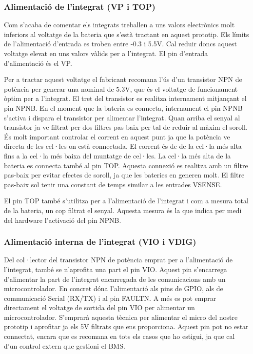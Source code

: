 \subsubsection{Alimentació de l'integrat (VP i TOP)}
Com s'acaba de comentar els integrats treballen a uns valors electrònics molt inferiors al voltatge de la bateria que s'està tractant en aquest prototip. Els límits de l'alimentació d'entrada es troben entre -0.3 i 5.5V. Cal reduir doncs aquest voltatge elevat en uns valors vàlids per a l'integrat. El pin d'entrada d'alimentació és el VP. 

Per a tractar aquest voltatge el fabricant recomana l'ús d'un transistor NPN de potència per generar una nominal de 5.3V, que és el voltatge de funcionament òptim per a l'integrat. El tret del transistor es realitza internament mitjançant el pin NPNB. En el moment que la bateria es connecta, internament el pin NPNB s'activa i dispara el transistor per alimentar l'integrat. Quan arriba el senyal al transistor ja ve filtrat per dos filtres pas-baix per tal de reduir al màxim el soroll. És molt important controlar el corrent en aquest punt ja que la potència ve directa de les cel·les on està connectada. El corrent és de de la cel·la més alta fins a la cel·la més baixa del muntatge de cel·les. La cel·la més alta de la bateria es connecta també al pin TOP. Aquesta connexió es realitza amb un filtre pas-baix per evitar efectes de soroll, ja que les bateries en generen molt. El filtre pas-baix sol tenir una constant de temps similar a les entrades VSENSE.

El pin TOP també s'utilitza per a l'alimentació de l'integrat i com a mesura total de la bateria, un cop filtrat el senyal. Aquesta mesura és la que indica per medi del hardware l'activació del pin NPNB.

\subsubsection{Alimentació interna de l'integrat (VIO i VDIG)}
Del col·lector del transistor NPN de potència emprat per a l'alimentació de l'integrat, també se n'aprofita una part el pin VIO. Aquest pin s'encarrega d'alimentar la part de l'integrat encarregada de les comunicacions amb un microcontrolador. En concret dóna l'alimentació als pins de GPIO, als de communicació Serial (RX/TX) i al pin FAULTN. A més es pot emprar directament el voltatge de sortida del pin VIO per alimentar un microcontrolador. S'emprarà aquesta tècnica per alimentar el micro del nostre prototip i aprofitar ja els 5V filtrats que ens proporciona. Aquest pin pot no estar connectat, encara que es recomana en tots els casos que ho estigui, ja que cal d'un control extern que gestioni el BMS. 

